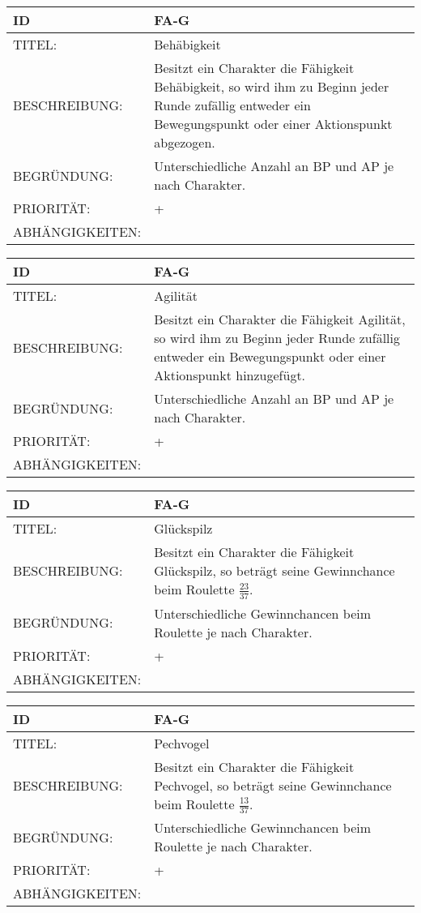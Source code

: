 \begin{tabularx}{16cm}{l|X}
	{table}\label{Behaebigkeit}
	\textbf{ID} & \textbf{FA-G \arabic{table}} \\
	\hline
	TITEL: & Behäbigkeit \\
	\hline
	BESCHREIBUNG: & Besitzt ein Charakter die Fähigkeit Behäbigkeit, so wird ihm zu Beginn jeder Runde zufällig entweder ein Bewegungspunkt oder einer Aktionspunkt abgezogen.\\
	\hline
	BEGRÜNDUNG: & Unterschiedliche Anzahl an BP und AP je nach Charakter.\\
	\hline
	PRIORITÄT: & +\\
	\hline
	ABHÄNGIGKEITEN: & \\
\end{tabularx}

\begin{tabularx}{16cm}{l|X}
	{table}\label{Agilitaet}
	\textbf{ID} & \textbf{FA-G \arabic{table}} \\
	\hline
	TITEL: & Agilität \\
	\hline
	BESCHREIBUNG: & Besitzt ein Charakter die Fähigkeit Agilität, so wird ihm zu Beginn jeder Runde zufällig entweder ein Bewegungspunkt oder einer Aktionspunkt hinzugefügt.\\
	\hline
	BEGRÜNDUNG: & Unterschiedliche Anzahl an BP und AP je nach Charakter.\\
	\hline
	PRIORITÄT: & +\\
	\hline
	ABHÄNGIGKEITEN: & \\
\end{tabularx}

\begin{tabularx}{16cm}{l|X}
	{table}\label{Glueckspilz}
	\textbf{ID} & \textbf{FA-G \arabic{table}} \\
	\hline
	TITEL: & Glückspilz \\
	\hline
	BESCHREIBUNG: & Besitzt ein Charakter die Fähigkeit Glückspilz, so beträgt seine Gewinnchance beim Roulette $\frac{23}{37}$.\\
	\hline
	BEGRÜNDUNG: & Unterschiedliche Gewinnchancen beim Roulette je nach Charakter.\\
	\hline
	PRIORITÄT: & +\\
	\hline
	ABHÄNGIGKEITEN: & \\
\end{tabularx}

\begin{tabularx}{16cm}{l|X}
	{table}\label{Pechvogel}
	\textbf{ID} & \textbf{FA-G \arabic{table}} \\
	\hline
	TITEL: & Pechvogel \\
	\hline
	BESCHREIBUNG: & Besitzt ein Charakter die Fähigkeit Pechvogel, so beträgt seine Gewinnchance beim Roulette $\frac{13}{37}$.\\
	\hline
	BEGRÜNDUNG: & Unterschiedliche Gewinnchancen beim Roulette je nach Charakter. \\
	\hline
	PRIORITÄT: & +\\
	\hline
	ABHÄNGIGKEITEN: &\\
\end{tabularx}

